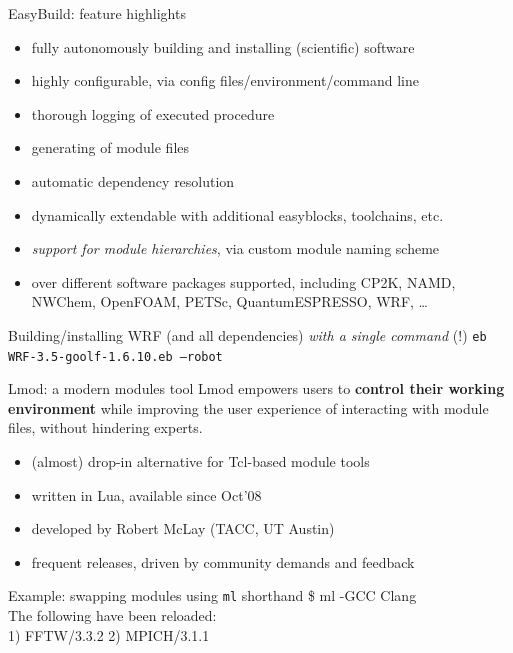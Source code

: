 \documentclass[10pt,xcolor={usenames,dvipsnames}]{beamer}
\begin{document}

\begin{frame}{EasyBuild: feature highlights}
    \begin{itemize}
        \item fully autonomously building and installing (scientific) software
        \item highly configurable, via config files/environment/command line
        \item thorough logging of executed procedure
        \item generating of module files
        \item automatic dependency resolution
        \item dynamically extendable with additional easyblocks, toolchains, etc.
        \item \emph{support for module hierarchies}, via custom module naming scheme
        \item over different software packages supported, including
              CP2K, NAMD, NWChem, OpenFOAM, PETSc, QuantumESPRESSO, WRF, \ldots
    \end{itemize}
    \begin{exampleblock}{Building/installing WRF (and all dependencies) \emph{with a single command} (!)}
        \texttt{eb WRF-3.5-goolf-1.6.10.eb --robot}
    \end{exampleblock}
\end{frame}


\begin{frame}{Lmod: a modern modules tool}
    Lmod empowers users to \textbf{control their working environment} while improving the user
    experience of interacting with module files, without hindering experts.
    \begin{itemize}
        \item \small{(almost)} drop-in alternative for Tcl-based module tools
        \item written in Lua, available since Oct'08
        \item developed by Robert McLay (TACC, UT Austin)
        \item frequent releases, driven by community demands and feedback
    \end{itemize}
    \begin{exampleblock}{Example: swapping modules using \texttt{ml} shorthand}
        \ttfamily
        \$ ml -GCC Clang\\
        The following have been reloaded:\\
        1) FFTW/3.3.2 2) MPICH/3.1.1
    \end{exampleblock}
\end{frame}
\end{document}
